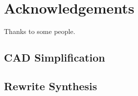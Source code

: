\documentclass[12pt, oneside]{report}
\begin{document}
\chapter*{Acknowledgements}
Thanks to some people.

\clearpage
\setcounter{page}{1}









 \section{CAD Simplification}
 \section{Rewrite Synthesis}
 
 




\end{document}
